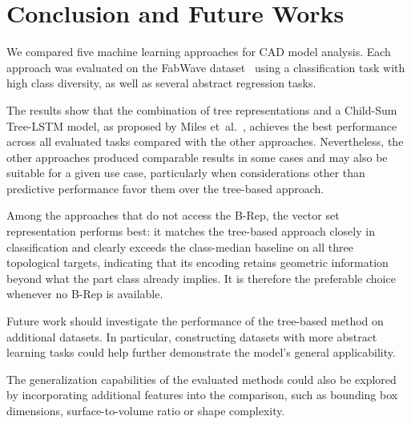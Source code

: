 \documentclass[5p,times,procedia]{elsarticle}
\newcommand{\iltodo}[2][]{\todo[inline, #1]{#2}}
\begin{document}
\section{Conclusion and Future Works}\label{sec:conclusion-and-future-works}
We compared five machine learning approaches for CAD model analysis.
Each approach was evaluated on the FabWave dataset~\cite{starly2019fabwave} using a classification task with high class diversity, as well as several abstract regression tasks.

The results show that the combination of tree representations and a Child-Sum Tree-LSTM model, as proposed by Miles et\ al.~\cite{miles2023recursive}, achieves the best performance across all evaluated tasks compared with the other approaches.
Nevertheless, the other approaches produced comparable results in some cases and may also be suitable for a given use case, particularly when considerations other than predictive performance favor them over the \mbox{tree-based} approach.

Among the approaches that do not access the B-Rep, the vector set representation performs best: it matches the tree-based approach closely in classification and clearly exceeds the class-median baseline on all three topological targets, indicating that its encoding retains geometric information beyond what the part class already implies. It is therefore the preferable choice whenever no B-Rep is available.

Future work should investigate the performance of the \mbox{tree-based} method on additional datasets.
In particular, constructing datasets with more abstract learning tasks could help further demonstrate the model's general applicability. 

The generalization capabilities of the evaluated methods could also be explored by incorporating additional features into the comparison, such as bounding box dimensions, \mbox{surface-to-volume} ratio or shape complexity.



\end{document}
